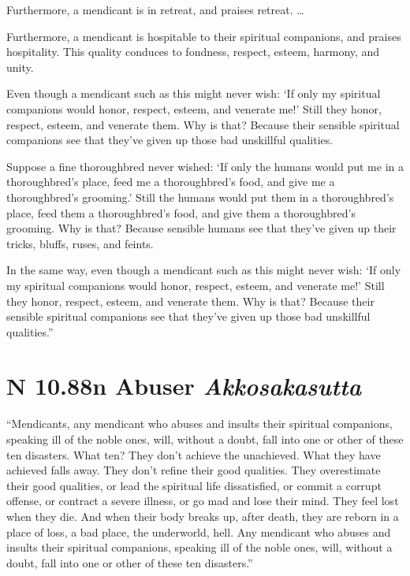 \documentclass[12pt,openany]{book}%
\newcommand*{\suttatitleacronym}[1]{\smaller[2]{#1}\vspace*{.3em}}
\newcommand*{\suttatitletranslation}[1]{\linebreak{#1}}
\newcommand*{\suttatitleroot}[1]{\linebreak\smaller[2]\itshape{#1}}
\newcommand*{\tocacronym}[1]{\hspace*{-3.3em}{#1}\quad}
\newcommand*{\toctranslation}[1]{#1}
\newcommand*{\tocroot}[1]{(\textit{#1})}
\begin{document}
Furthermore, a mendicant is in retreat, and praises retreat. … 

Furthermore, a mendicant is hospitable to their spiritual companions, and praises hospitality. This quality conduces to fondness, respect, esteem, harmony, and unity. 

Even though a mendicant such as this might never wish: ‘If only my spiritual companions would honor, respect, esteem, and venerate me!’ Still they honor, respect, esteem, and venerate them. Why is that? Because their sensible spiritual companions see that they’ve given up those bad unskillful qualities. 

Suppose a fine thoroughbred never wished: ‘If only the humans would put me in a thoroughbred’s place, feed me a thoroughbred’s food, and give me a thoroughbred’s grooming.’ Still the humans would put them in a thoroughbred’s place, feed them a thoroughbred’s food, and give them a thoroughbred’s grooming. Why is that? Because sensible humans see that they’ve given up their tricks, bluffs, ruses, and feints. 

In the same way, even though a mendicant such as this might never wish: ‘If only my spiritual companions would honor, respect, esteem, and venerate me!’ Still they honor, respect, esteem, and venerate them. Why is that? Because their sensible spiritual companions see that they’ve given up those bad unskillful qualities.” 

%
\section*{{\suttatitleacronym AN 10.88}{\suttatitletranslation An Abuser }{\suttatitleroot Akkosakasutta}}
\addcontentsline{toc}{section}{\tocacronym{AN 10.88} \toctranslation{An Abuser } \tocroot{Akkosakasutta}}

“Mendicants, any mendicant who abuses and insults their spiritual companions, speaking ill of the noble ones, will, without a doubt, fall into one or other of these ten disasters. What ten? They don’t achieve the unachieved. What they have achieved falls away. They don’t refine their good qualities. They overestimate their good qualities, or lead the spiritual life dissatisfied, or commit a corrupt offense, or contract a severe illness, or go mad and lose their mind. They feel lost when they die. And when their body breaks up, after death, they are reborn in a place of loss, a bad place, the underworld, hell. Any mendicant who abuses and insults their spiritual companions, speaking ill of the noble ones, will, without a doubt, fall into one or other of these ten disasters.” 
\end{document}
